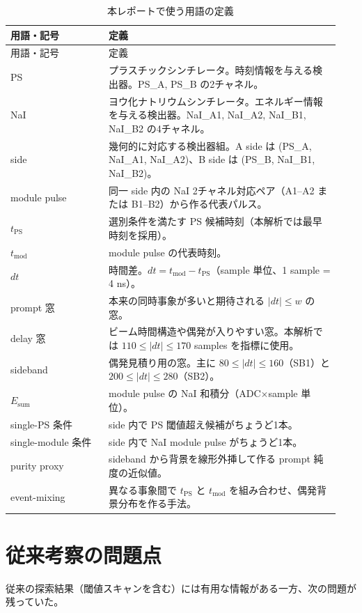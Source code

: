 \documentclass[a4paper,11pt]{jsarticle}
\begin{document}
\begin{longtable}{p{0.28\linewidth}p{0.66\linewidth}}
\caption{本レポートで使う用語の定義}\label{tab:def}\\
\toprule
用語・記号 & 定義 \\
\midrule
\endfirsthead
\toprule
用語・記号 & 定義 \\
\midrule
\endhead
\bottomrule
\endfoot
PS & プラスチックシンチレータ。時刻情報を与える検出器。PS\_A, PS\_B の2チャネル。 \\
NaI & ヨウ化ナトリウムシンチレータ。エネルギー情報を与える検出器。NaI\_A1, NaI\_A2, NaI\_B1, NaI\_B2 の4チャネル。 \\
side & 幾何的に対応する検出器組。A side は (PS\_A, NaI\_A1, NaI\_A2)、B side は (PS\_B, NaI\_B1, NaI\_B2)。 \\
module pulse & 同一 side 内の NaI 2チャネル対応ペア（A1--A2 または B1--B2）から作る代表パルス。 \\
$t_{\mathrm{PS}}$ & 選別条件を満たす PS 候補時刻（本解析では最早時刻を採用）。 \\
$t_{\mathrm{mod}}$ & module pulse の代表時刻。 \\
$dt$ & 時間差。$dt=t_{\mathrm{mod}}-t_{\mathrm{PS}}$（sample 単位、1 sample = 4 ns）。 \\
prompt 窓 & 本来の同時事象が多いと期待される $|dt| \le w$ の窓。 \\
delay 窓 & ビーム時間構造や偶発が入りやすい窓。本解析では $110 \le |dt| \le 170$ samples を指標に使用。 \\
sideband & 偶発見積り用の窓。主に $80 \le |dt| \le 160$（SB1）と $200 \le |dt| \le 280$（SB2）。 \\
$E_{\mathrm{sum}}$ & module pulse の NaI 和積分（ADC$\times$sample 単位）。 \\
single-PS 条件 & side 内で PS 閾値超え候補がちょうど1本。 \\
single-module 条件 & side 内で NaI module pulse がちょうど1本。 \\
purity proxy & sideband から背景を線形外挿して作る prompt 純度の近似値。 \\
event-mixing & 異なる事象間で $t_{\mathrm{PS}}$ と $t_{\mathrm{mod}}$ を組み合わせ、偶発背景分布を作る手法。 \\
\end{longtable}

\section{従来考察の問題点}
従来の探索結果（閾値スキャンを含む）には有用な情報がある一方、次の問題が残っていた。
\end{document}
